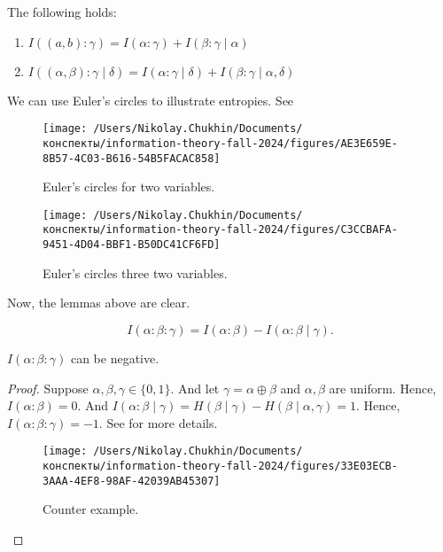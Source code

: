 \begin{lemma}
    The following holds:
    \begin{enumerate}
        \item $I((a, b) : \gamma) = I(\alpha : \gamma) + I(\beta : \gamma \mid \alpha)$
        \item  $I((\alpha, \beta) : \gamma \mid \delta) = I(\alpha : \gamma \mid \delta) + I(\beta : \gamma \mid \alpha, \delta)$
    \end{enumerate}
\end{lemma}

We can use Euler's circles to illustrate entropies.
See 

\begin{figure}[H]
    \centering
    \texttt{[image: /Users/Nikolay.Chukhin/Documents/конспекты/information-theory-fall-2024/figures/AE3E659E-8B57-4C03-B616-54B5FACAC858]}
    \caption{Euler's circles for two variables.}
    \label{fig:ae3e659e-8b57-4c03-b616-54b5facac858}
\end{figure}

\begin{figure}[H]
    \centering
    \texttt{[image: /Users/Nikolay.Chukhin/Documents/конспекты/information-theory-fall-2024/figures/C3CCBAFA-9451-4D04-BBF1-B50DC41CF6FD]}
    \caption{Euler's circles three two variables.}
    \label{fig:c3ccbafa-9451-4d04-bbf1-b50dc41cf6fd}
\end{figure}

Now, the lemmas above are clear.

\begin{definition}
    \[
        I(\alpha : \beta : \gamma) = I(\alpha : \beta) - I(\alpha : \beta \mid \gamma).
    \]
\end{definition}
\begin{lemma}
    $I(\alpha : \beta : \gamma)$ can be negative.
\end{lemma}
\begin{proof}
    Suppose $\alpha, \beta, \gamma \in \{0, 1\}$.
    And let $\gamma = \alpha \oplus \beta$ and $\alpha, \beta$ are uniform.
    Hence, $I(\alpha \colon \beta) = 0$.
    And  $I(\alpha : \beta \mid \gamma) = H(\beta \mid \gamma) - H(\beta \mid \alpha, \gamma) = 1$.
    Hence,  $I(\alpha : \beta : \gamma) = -1$.
    See  for more details.
    \begin{figure}[H]
        \centering
        \texttt{[image: /Users/Nikolay.Chukhin/Documents/конспекты/information-theory-fall-2024/figures/33E03ECB-3AAA-4EF8-98AF-42039AB45307]}
        \caption{Counter example.}
        \label{fig:33e03ecb-3aaa-4ef8-98af-42039ab45307}
    \end{figure}

\end{proof}



